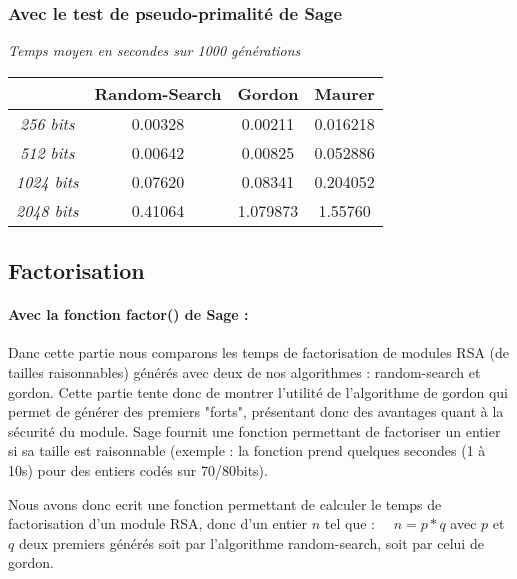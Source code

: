 \documentclass[a4paper,11pt]{article}
\begin{document}
\subsubsection{ Avec le test de pseudo-primalité de Sage} 

\begin{center}
\emph{Temps moyen en secondes sur 1000 générations}
 \begin{tabular}{||c | c | c | c ||} 
 \hline
 \textbf{} & \textbf{Random-Search} & \textbf{Gordon} & \textbf{Maurer} \\ [0.5ex] 
 \hline\hline
 \emph{256 bits} & 0.00328 & 0.00211  & 0.016218 \\ 
 \hline
 \emph{512 bits} & 0.00642 & 0.00825  & 0.052886 \\
 \hline
 \emph{1024 bits}  & 0.07620 & 0.08341 & 0.204052 \\
 \hline
 \emph{2048 bits} & 0.41064 &  1.079873 & 1.55760 \\
 \hline
\end{tabular}
\end{center}


\subsection{Factorisation }

\paragraph{ Avec la fonction factor() de Sage : } \newline \medbreak
Danc cette partie nous comparons les temps de factorisation de modules RSA (de tailles raisonnables) générés avec deux de nos algorithmes : random-search et gordon. Cette partie tente donc de montrer l'utilité de l'algorithme de gordon qui permet de générer des premiers "forts", présentant donc des avantages quant à la sécurité du module.
Sage fournit une fonction permettant de factoriser un entier si sa taille est raisonnable (exemple : la fonction prend quelques secondes (1 à 10s) pour des entiers codés sur 70/80bits). 
\par Nous avons donc ecrit une fonction permettant de calculer le temps de factorisation d'un module RSA, donc d'un entier $n$ tel que : \
\ $n = p * q$ 
\newline avec $p$ et $q$ deux premiers générés soit par l'algorithme random-search, soit par celui de gordon.
\end{document}
